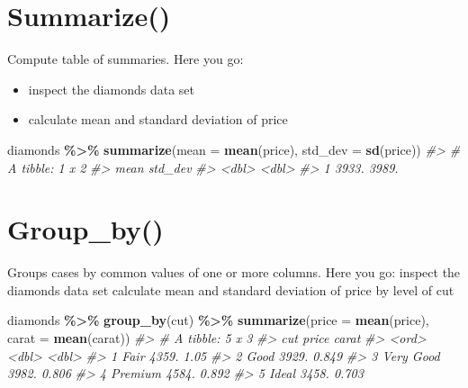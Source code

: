 \documentclass[
]{book}
\newenvironment{Shaded}{\begin{snugshade}}{\end{snugshade}}
\newcommand{\AttributeTok}[1]{\textcolor[rgb]{0.13,0.29,0.53}{#1}}
\newcommand{\CommentTok}[1]{\textcolor[rgb]{0.56,0.35,0.01}{\textit{#1}}}
\newcommand{\FunctionTok}[1]{\textcolor[rgb]{0.13,0.29,0.53}{\textbf{#1}}}
\newcommand{\NormalTok}[1]{#1}
\newcommand{\SpecialCharTok}[1]{\textcolor[rgb]{0.81,0.36,0.00}{\textbf{#1}}}
\providecommand{\tightlist}{%
  \setlength{\itemsep}{0pt}\setlength{\parskip}{0pt}}
\begin{document}
\section*{Summarize()}\label{summarize}

Compute table of summaries. Here you go:

\begin{itemize}
\tightlist
\item
  inspect the diamonds data set
\item
  calculate mean and standard deviation of price
\end{itemize}

\begin{Shaded}
\begin{Highlighting}[]
\NormalTok{diamonds }\SpecialCharTok{\%\textgreater{}\%} \FunctionTok{summarize}\NormalTok{(}\AttributeTok{mean =} \FunctionTok{mean}\NormalTok{(price), }\AttributeTok{std\_dev =} \FunctionTok{sd}\NormalTok{(price))}
\CommentTok{\#\textgreater{} \# A tibble: 1 x 2}
\CommentTok{\#\textgreater{}    mean std\_dev}
\CommentTok{\#\textgreater{}   \textless{}dbl\textgreater{}   \textless{}dbl\textgreater{}}
\CommentTok{\#\textgreater{} 1 3933.   3989.}
\end{Highlighting}
\end{Shaded}

\section*{Group\_by()}\label{group_by}

Groups cases by common values of one or more columns. Here you go:
inspect the diamonds data set calculate mean and standard deviation of
price by level of cut

\begin{Shaded}
\begin{Highlighting}[]
\NormalTok{diamonds }\SpecialCharTok{\%\textgreater{}\%} 
        \FunctionTok{group\_by}\NormalTok{(cut) }\SpecialCharTok{\%\textgreater{}\%} 
        \FunctionTok{summarize}\NormalTok{(}\AttributeTok{price =} \FunctionTok{mean}\NormalTok{(price), }\AttributeTok{carat =} \FunctionTok{mean}\NormalTok{(carat))}
\CommentTok{\#\textgreater{} \# A tibble: 5 x 3}
\CommentTok{\#\textgreater{}   cut       price carat}
\CommentTok{\#\textgreater{}   \textless{}ord\textgreater{}     \textless{}dbl\textgreater{} \textless{}dbl\textgreater{}}
\CommentTok{\#\textgreater{} 1 Fair      4359. 1.05 }
\CommentTok{\#\textgreater{} 2 Good      3929. 0.849}
\CommentTok{\#\textgreater{} 3 Very Good 3982. 0.806}
\CommentTok{\#\textgreater{} 4 Premium   4584. 0.892}
\CommentTok{\#\textgreater{} 5 Ideal     3458. 0.703}
\end{Highlighting}
\end{Shaded}
\end{document}
